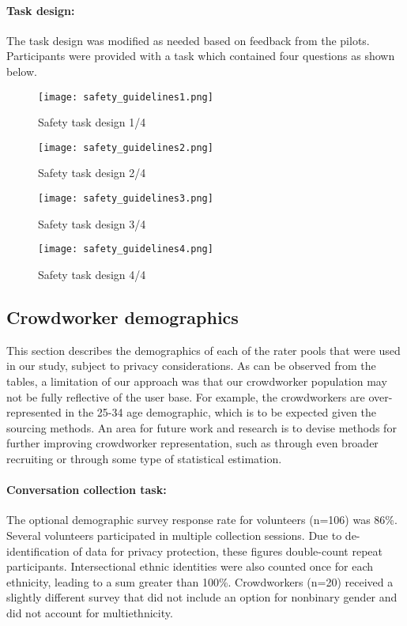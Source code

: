 \documentclass{article}
\begin{document}
\paragraph{Task design:} The task design was modified as needed based on feedback from the pilots. Participants were provided with a task which contained four questions as shown below.

\begin{figure}[h!]
    \centering
\texttt{[image: safety\_guidelines1.png]}
    \caption{Safety task design 1/4}
    \label{fig:safety-design1.png)}
\end{figure}

\begin{figure}[h!]
    \centering
\texttt{[image: safety\_guidelines2.png]}
    \caption{Safety task design 2/4}
    \label{fig:safety-design2.png)}
\end{figure}

\begin{figure}[h!]
    \centering
\texttt{[image: safety\_guidelines3.png]}
    \caption{Safety task design 3/4}
    \label{fig:safety-design3.png)}
\end{figure}

\begin{figure}[h!]
    \centering
\texttt{[image: safety\_guidelines4.png]}
    \caption{Safety task design 4/4}
    \label{fig:safety-design4.png)}
\end{figure}

\FloatBarrier
\newpage

\subsection{Crowdworker demographics}
\label{sec:rater-demographics}
This section describes the demographics of each of the rater pools that were used in our study, subject to privacy considerations. As can be observed from the tables, a  limitation of our approach was that our crowdworker population may not be fully reflective of the user base. For example, the crowdworkers are over-represented in the 25-34 age demographic, which is to be expected given the sourcing methods. An area for future work and research is to devise methods for further improving crowdworker representation, such as through  even broader recruiting or through some type of statistical estimation.

\paragraph{Conversation collection task:} The optional demographic survey response rate for volunteers (n=106) was 86\%. Several volunteers participated in multiple collection sessions. Due to de-identification of data for privacy protection, these figures double-count repeat participants. Intersectional ethnic identities were also counted once for each ethnicity, leading to a sum greater than 100\%. Crowdworkers (n=20) received a slightly different survey that did not include an option for nonbinary gender and did not account for multiethnicity.
\end{document}

